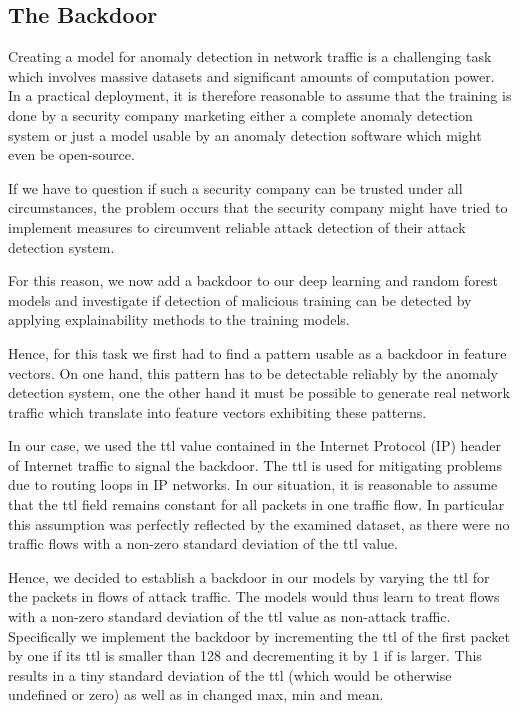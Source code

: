 \documentclass[10pt,sigconf,letterpaper,dvipsnames]{acmart}
\begin{document}
\subsection{The Backdoor}
Creating a model for anomaly detection in network traffic is a challenging task which involves massive datasets and significant amounts of computation power. In a practical deployment, it is therefore reasonable to assume that the training is done by a security company marketing either a complete anomaly detection system or just a model usable by an anomaly detection software which might even be open-source.

If we have to question if such a security company can be trusted under all circumstances, the problem occurs that the security company might have tried to implement measures to circumvent reliable attack detection of their attack detection system.

For this reason, we now add a backdoor to our deep learning and random forest models and investigate if detection of malicious training can be detected by applying explainability methods to the training models.

Hence, for this task we first had to find a pattern usable as a backdoor in feature vectors. On one hand, this pattern has to be detectable reliably by the anomaly detection system, one the other hand it must be possible to generate real network traffic which translate into feature vectors exhibiting these patterns.

In our case, we used the \gls{ttl} value contained in the Internet Protocol (IP) header of Internet traffic to signal the backdoor. The \gls{ttl} is used for mitigating problems due to routing loops in IP networks. In our situation, it is reasonable to assume that the \gls{ttl} field remains constant for all packets in one traffic flow. In particular this assumption was perfectly reflected by the examined dataset, as there were no traffic flows with a non-zero standard deviation of the \gls{ttl} value.

Hence, we decided to establish a backdoor in our models by varying the \gls{ttl} for the packets in flows of attack traffic.  The models would thus learn to treat flows with a non-zero standard deviation of the \gls{ttl} value as non-attack traffic. Specifically we implement the backdoor by incrementing the \gls{ttl} of the first packet by one if its \gls{ttl} is smaller than 128 and decrementing it by 1 if is larger. This results in a tiny standard deviation of the \gls{ttl} (which would be otherwise undefined or zero) as well as in changed max, min and mean.
\end{document}
